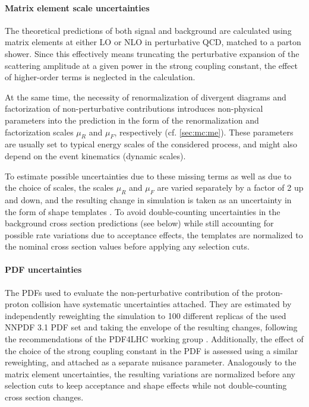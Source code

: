\paragraph{Matrix element scale uncertainties}

The theoretical predictions of both signal and background are calculated using matrix elements at either LO or NLO in perturbative QCD, matched to a parton shower. Since this effectively means truncating the perturbative expansion of the scattering amplitude at a given power in the strong coupling constant, the effect of higher-order terms is neglected in the calculation.

At the same time, the necessity of renormalization of divergent diagrams and factorization of non-perturbative contributions introduces non-physical parameters into the prediction in the form of the renormalization and factorization scales $\mu_R$ and $\mu_F$, respectively (cf. \cref{sec:mc:me}). These parameters are usually set to typical energy scales of the considered process, and might also depend on the event kinematics (dynamic scales).

To estimate possible uncertainties due to these missing terms as well as due to the choice of scales, the scales $\mu_R$ and $\mu_F$ are varied separately by a factor of 2 up and down, and the resulting change in simulation is taken as an uncertainty in the form of shape templates \cite{Cacciari:2004}. %
To avoid double-counting uncertainties in the background cross section predictions (see below) while still accounting for possible rate variations due to acceptance effects, the templates are normalized to the nominal cross section values before applying any selection cuts.

\paragraph{PDF uncertainties}

The PDFs used to evaluate the non-perturbative contribution of the proton-proton collision have systematic uncertainties attached. They are estimated by independently reweighting the simulation to 100 different replicas of the used NNPDF 3.1 PDF set and taking the envelope of the resulting changes, following the recommendations of the PDF4LHC working group \cite{Butterworth:2015oua}. Additionally, the effect of the choice of the strong coupling constant in the PDF is assessed using a similar reweighting, and attached as a separate nuisance parameter. Analogously to the matrix element uncertainties, the resulting variations are normalized before any selection cuts to keep acceptance and shape effects while not double-counting cross section changes.

